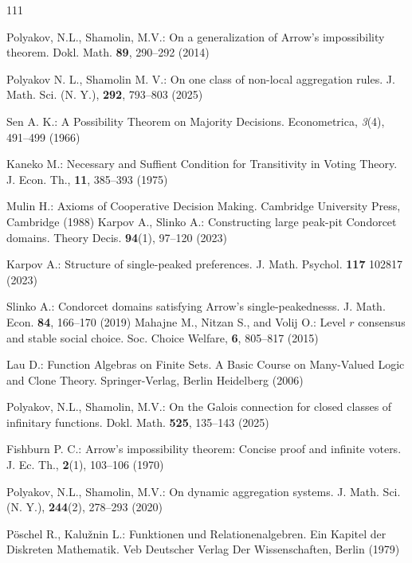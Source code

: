 \documentclass[graybox]{SNmult}
\theoremstyle{definition}
\begin{document}
\begin{thebibliography}{111}
		
		Polyakov, N.L., Shamolin, M.V.: On a generalization of Arrow's impossibility theorem. Dokl. Math. \textbf{89}, 290--292 (2014)
			
	
		 Polyakov N. L., Shamolin M. V.: On one class of non-local aggregation rules. J. Math. Sci. (N. Y.), \textbf{292}, 793--803 (2025)


		

	
		 Sen A. K.: A Possibility Theorem on Majority Decisions. Econometrica, \textit{3}(4), 491--499 (1966)
	
	 Kaneko M.: Necessary and Suffient Condition for Transitivity in Voting
	Theory. J.  Econ. Th., \textbf{11}, 385--393 (1975)
	
		 Mulin H.: Axioms of Cooperative Decision Making. Cambridge University Press, Cambridge (1988)
		 Karpov A., Slinko A.: Constructing large peak-pit Condorcet domains. Theory Decis. \textbf{94}(1), 97--120 (2023)
	
	 Karpov A.: Structure of single-peaked preferences. J. Math. Psychol. \textbf{117} 102817 (2023)
	
	 Slinko A.: Condorcet domains satisfying Arrow’s single-peakednesss. J. Math. Econ. \textbf{84}, 166--170 (2019)
		  Mahajne M., Nitzan S., and Volij O.: Level $r$ consensus and stable social choice. Soc. Choice Welfare, \textbf{6}, 805--817 (2015)
		
		Lau D.: Function Algebras on Finite Sets. A Basic Course on Many-Valued Logic and Clone Theory. Springer-Verlag, Berlin Heidelberg (2006)
		
		
		 Polyakov, N.L., Shamolin, M.V.: On the Galois connection for closed classes of infinitary functions.  Dokl. Math. \textbf{525}, 135--143 (2025)
			

	
Fishburn P. C.: Arrow’s impossibility theorem: Concise proof and infinite voters. J. Ec. Th., \textbf{2}(1), 103--106 (1970)
	
	
	

	
	Polyakov, N.L., Shamolin, M.V.: On dynamic aggregation systems. J. Math. Sci. (N. Y.), \textbf{244}(2), 278--293 (2020)
	
	

	
	P\"{o}schel R.,  Kalu\v{z}nin L.: Funktionen und Relationenalgebren. Ein Kapitel der Diskreten Mathematik. Veb Deutscher Verlag Der Wissenschaften, Berlin (1979) 
	

\end{thebibliography}
\end{document}
